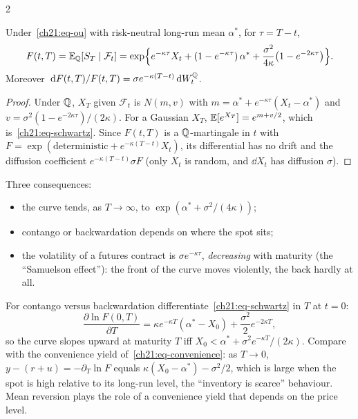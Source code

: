 \begin{paracol}{2}
\begin{theorem}\label{ch21:thm-schwartz}
Under~\eqref{ch21:eq-ou} with risk-neutral long-run mean $\alpha^*$, for $\tau=T-t$,
\begin{equation}\label{ch21:eq-schwartz}
  F(t,T)=\mathbb{E}_{\mathbb{Q}}[S_T\mid\mathcal F_t]=\exp\Bigl\{e^{-\kappa\tau}X_t+(1-e^{-\kappa\tau})\,\alpha^*+\frac{\sigma^2}{4\kappa}\bigl(1-e^{-2\kappa\tau}\bigr)\Bigr\}.
\end{equation}
Moreover $\,\mathrm{d} F(t,T)/F(t,T)=\sigma e^{-\kappa(T-t)}\,\mathrm{d} W^{\mathbb{Q}}_t$.
\end{theorem}
\begin{proof}
Under $\mathbb{Q}$, $X_T$ given $\mathcal F_t$ is $N(m,v)$ with $m=\alpha^*+e^{-\kappa\tau}(X_t-\alpha^*)$ and $v=\sigma^2(1-e^{-2\kappa\tau})/(2\kappa)$. For a Gaussian $X_T$, $\mathbb{E}[e^{X_T}]=e^{m+v/2}$, which is~\eqref{ch21:eq-schwartz}. Since $F(t,T)$ is a $\mathbb{Q}$-martingale in $t$ with $F=\exp(\text{deterministic}+e^{-\kappa(T-t)}X_t)$, its
differential has no drift and the diffusion coefficient $e^{-\kappa(T-t)}\sigma F$ (only $X_t$ is random, and $\dd X_t$ has diffusion $\sigma$).
\end{proof}
Three consequences:
\begin{itemize}
  \item the curve tends, as $T\to\infty$, to $\exp(\alpha^*+\sigma^2/(4\kappa))$;
  \item contango or backwardation depends on where the spot sits;
  \item the volatility of a futures contract is $\sigma e^{-\kappa\tau}$, \emph{decreasing} with maturity (the ``Samuelson effect''): the front of the curve moves violently, the back hardly at all.
\end{itemize}
For contango versus backwardation differentiate~\eqref{ch21:eq-schwartz} in $T$ at $t=0$:
\[
\frac{\partial\ln F(0,T)}{\partial T}=\kappa e^{-\kappa T}(\alpha^*-X_0)+\frac{\sigma^2}{2}e^{-2\kappa T},
\]
so the curve slopes upward at maturity $T$ iff $X_0<\alpha^*+\sigma^2e^{-\kappa T}/(2\kappa)$. Compare with the convenience yield of~\eqref{ch21:eq-convenience}: as $T\to0$, $y-(r+u)=-\partial_T\ln F$ equals $\kappa(X_0-\alpha^*)-\sigma^2/2$, which is large when the spot is high relative to
its long-run level, the ``inventory is scarce'' behaviour. Mean reversion plays the role of a convenience yield that depends on the price level.


\end{paracol}
